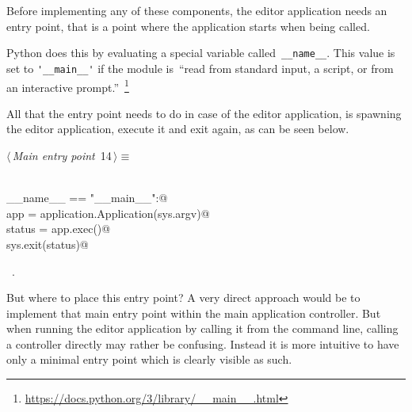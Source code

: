 \documentclass[
    a4paper,      %
    10pt,         %
    openright,    %
    notitlepage,  %
    parskip=half, %
]{scrreprt}       %
\theoremstyle{definition}                    %
\begin{document}
Before implementing any of these components, the editor application needs an
entry point, that is a point where the application starts when being called.

Python does this by evaluating a special variable called~\verb+__name__+. This
value is set to \verb+'__main__'+ if the module is~\enquote{read from standard
input, a script, or from an interactive
prompt.}~\footnote{\url{https://docs.python.org/3/library/__main__.html}}

All that the entry point needs to do in case of the editor application, is
spawning the editor application, execute it and exit again, as can be seen below.

\begin{flushleft} \small
\begin{minipage}{\linewidth}\label{scrap1}\raggedright\small
{} $\langle\,${\itshape Main entry point}\nobreak\ {\footnotesize {14}}$\,\rangle\equiv$
\vspace{-1ex}
\begin{list}{}{} \item
\mbox{}\lstinline@@\\
\mbox{}\lstinline@if __name__ == "__main__":@\\
\mbox{}\lstinline@  app = application.Application(sys.argv)@\\
\mbox{}\lstinline@  status = app.exec()@\\
\mbox{}\lstinline@  sys.exit(status)@\\
\mbox{}\lstinline@@{\NWsep}
\end{list}
\vspace{-1.5ex}
\footnotesize
\begin{list}{}{\setlength{\itemsep}{-\parsep}\setlength{\itemindent}{-\leftmargin}}
\item \NWtxtMacroRefIn\ .

\item{}
\end{list}
\end{minipage}\vspace{4ex}
\end{flushleft}
But where to place this entry point? A very direct approach would be to
implement that main entry point within the main application controller. But when
running the editor application by calling it from the command line, calling a
controller directly may rather be confusing. Instead it is more intuitive to
have only a minimal entry point which is clearly visible as such.
\end{document}
